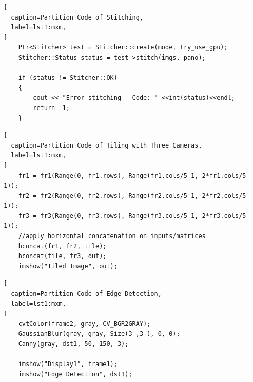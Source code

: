 \documentclass[letterpaper,10pt,serif,draftclsnofoot,onecolumn,compsoc,titlepage]{IEEEtran}
\begin{document}
\begin{lstlisting}[
  caption=Partition Code of Stitching,
  label=lst1:mxm,
]
	Ptr<Stitcher> test = Stitcher::create(mode, try_use_gpu);
    Stitcher::Status status = test->stitch(imgs, pano);
  
    if (status != Stitcher::OK)
    {
        cout << "Error stitching - Code: " <<int(status)<<endl;
        return -1;
    }
\end{lstlisting}

\begin{lstlisting}[
  caption=Partition Code of Tiling with Three Cameras,
  label=lst1:mxm,
]
	fr1 = fr1(Range(0, fr1.rows), Range(fr1.cols/5-1, 2*fr1.cols/5-1));
	fr2 = fr2(Range(0, fr2.rows), Range(fr2.cols/5-1, 2*fr2.cols/5-1));
	fr3 = fr3(Range(0, fr3.rows), Range(fr3.cols/5-1, 2*fr3.cols/5-1));
	//apply horizontal concatenation on inputs/matrices
	hconcat(fr1, fr2, tile);        	
	hconcat(tile, fr3, out);
    imshow("Tiled Image", out);
\end{lstlisting}

\begin{lstlisting}[
  caption=Partition Code of Edge Detection,
  label=lst1:mxm,
]
	cvtColor(frame2, gray, CV_BGR2GRAY);
	GaussianBlur(gray, gray, Size(3 ,3 ), 0, 0);
	Canny(gray, dst1, 50, 150, 3);
		
	imshow("Display1", frame1);
	imshow("Edge Detection", dst1);
\end{lstlisting}

\nocite{*}
\newpage


\end{document}
